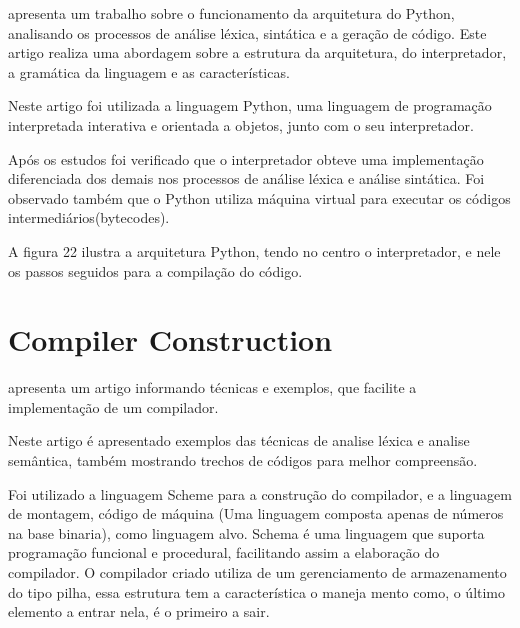 \documentclass[12pt,oneside,a4paper,chapter=TITLE,section=TITLE,sumario=tradicional]{abntex2}
\begin{document}
\cite{eduardo2010} apresenta um trabalho sobre o funcionamento da arquitetura do Python, analisando os processos de análise léxica, sintática e a geração de código. Este artigo realiza uma abordagem sobre a estrutura da arquitetura, do interpretador, a gramática da linguagem e as características.

Neste artigo foi utilizada a linguagem Python, uma linguagem de programação interpretada interativa e orientada a objetos, junto com o seu interpretador.

Após os estudos foi verificado que o interpretador obteve uma implementação diferenciada dos demais nos processos de análise léxica e análise sintática. Foi observado também que o Python utiliza máquina virtual para executar os códigos intermediários(bytecodes).

A figura 22 ilustra a arquitetura Python, tendo no centro o interpretador, e nele os passos seguidos para a compilação do código.

\begin{figure}[htb]
\end{figure}

\section{ Compiler Construction}
\label{sec:compiler-construction}

\cite{aastha2013} apresenta um artigo informando técnicas e exemplos, que facilite a implementação de um compilador. 

Neste artigo é apresentado exemplos das técnicas de analise léxica e analise semântica, também mostrando trechos de códigos para melhor compreensão.

Foi utilizado a linguagem Scheme para a construção do compilador, e a linguagem de montagem, código de máquina (Uma linguagem composta apenas de números na base binaria), como linguagem alvo. Schema é uma linguagem que suporta programação funcional e procedural, facilitando assim a elaboração do compilador. O compilador criado utiliza de um gerenciamento de armazenamento do tipo pilha, essa estrutura tem a característica o maneja mento como, o último elemento a entrar nela, é o primeiro a sair.
\end{document}
